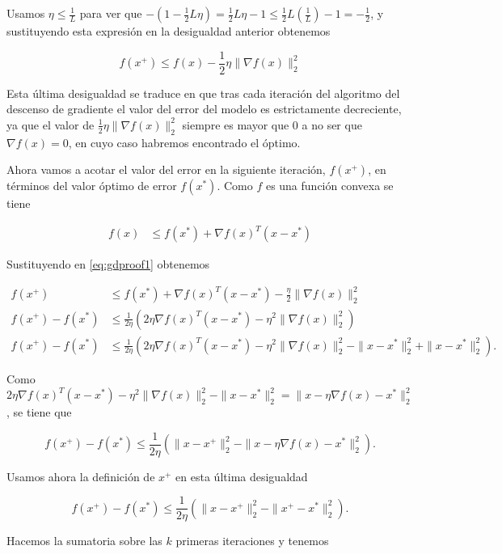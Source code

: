 Usamos $\eta \leq \frac{1}{L}$ para ver que $-(1-\frac{1}{2}L \eta)= \frac{1}{2} L \eta - 1 \leq \frac{1}{2} L (\frac{1}{L}) - 1 = -\frac{1}{2}$, y sustituyendo esta expresión en la desigualdad anterior obtenemos 

\begin{equation}\label{eq:gdproof1}
	f(x^+) \leq f(x) - \frac{1}{2} \eta \| \nabla f(x) \|^2_2 
\end{equation}

Esta última desigualdad se traduce en que tras cada iteración del algoritmo del descenso de gradiente el valor del error del modelo es estrictamente decreciente, ya que el valor de $\frac{1}{2} \eta \| \nabla f(x) \|^2_2$ siempre es mayor que 0 a no ser que $\nabla f(x)=0$, en cuyo caso habremos encontrado el óptimo. 

Ahora vamos a acotar el valor del error en la siguiente iteración, $f(x^+)$, en términos del valor óptimo de error $f(x^*)$. Como $f$ es una función convexa se tiene

\begin{align*}
    f(x) &\leq f(x^*) + \nabla f(x)^T (x-x^*)
\end{align*}

Sustituyendo en \ref{eq:gdproof1} obtenemos

\begin{align*}
    f(x^+) &\leq f(x^*) + \nabla f(x)^T (x-x^*) - \frac{\eta}{2} \| \nabla f(x) \| ^2_2 \\ 
    f(x^+) - f(x^*) &\leq  \frac{1}{2\eta}  \left ( 2 \eta \nabla f(x)^T (x-x^*) - \eta ^2 \| \nabla f(x) \| ^2_2 \right ) \\ 
    f(x^+) - f(x^*) &\leq  \frac{1}{2\eta}  \left ( 2 \eta \nabla f(x)^T (x-x^*) - \eta ^2 \| \nabla f(x) \| ^2_2 - \| x - x^* \|^2_2 + \| x - x^* \|^2_2 \right ).    
\end{align*}

Como $  2 \eta \nabla f(x)^T (x-x^*) - \eta ^2 \| \nabla f(x) \| ^2_2 - \| x - x^* \|^2_2 = \| x - \eta \nabla f(x) - x^* \|^2_2 $, se tiene que

$$ f(x^+) - f(x^*) \leq  \frac{1}{2\eta}  \left ( \| x - x^+ \|^2_2 -  \| x - \eta \nabla f(x) - x^* \|^2_2 \right ) .$$

Usamos ahora la definición de $x^+$ en esta última desigualdad

$$ f(x^+) - f(x^*) \leq  \frac{1}{2\eta}  \left ( \| x - x^+ \|^2_2 -  \| x^+ - x^* \|^2_2 \right ) .$$

Hacemos la sumatoria sobre las $k$ primeras iteraciones y tenemos

